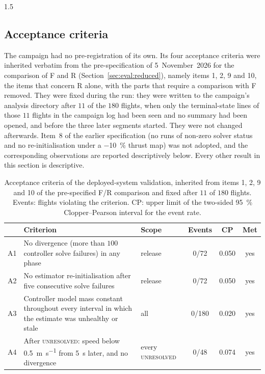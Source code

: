 \begin{spacing}{1.5}
\subsection{Acceptance criteria}\label{sec:eval:dep:accept}

The campaign had no pre-registration of its own. Its four acceptance criteria
were inherited verbatim from the pre-specification of 5~November~2026 for the
comparison of F and R (Section~\ref{sec:eval:reduced}), namely items 1, 2, 9 and
10, the items that concern R alone, with the parts that require a comparison
with F removed. They were fixed during the run: they were written to the
campaign's analysis directory after $11$ of the $180$ flights, when only the
terminal-state lines of those $11$ flights in the campaign log had been seen and
no summary had been opened, and before the three later segments started. They
were not changed afterwards. Item~8 of the earlier specification (no runs of
non-zero solver status and no re-initialisation under a \SI{-10}{\percent}
thrust map) was not adopted, and the corresponding observations are reported
descriptively below. Every other result in this section is descriptive.

\begin{table}[ht]
\centering
\caption[Acceptance criteria of the deployed-system validation]{Acceptance
criteria of the deployed-system validation, inherited from items 1, 2, 9 and 10
of the pre-specified F/R comparison and fixed after $11$ of $180$ flights.
Events: flights violating the criterion. CP: upper limit of the two-sided
\SI{95}{\percent} Clopper--Pearson interval for the event rate.}
\label{tab:dep-accept}
\small
\begin{tabularx}{\textwidth}{@{}l >{\raggedright\arraybackslash}X l c c c@{}}
\toprule
& \textbf{Criterion} & \textbf{Scope} & \textbf{Events} & \textbf{CP} & \textbf{Met} \\
\midrule
A1 & No divergence (more than $100$ controller solve failures) in any phase & release & 0/72 & 0.050 & yes \\
A2 & No estimator re-initialisation after five consecutive solve failures & release & 0/72 & 0.050 & yes \\
A3 & Controller model mass constant throughout every interval in which the estimate was unhealthy or stale & all & 0/180 & 0.020 & yes \\
A4 & After \textsc{unresolved}: speed below \SI{0.5}{\meter\per\second} from \SI{5}{\second} later, and no divergence & every \textsc{unresolved} & 0/48 & 0.074 & yes \\
\bottomrule
\end{tabularx}
\end{table}


\end{spacing}
